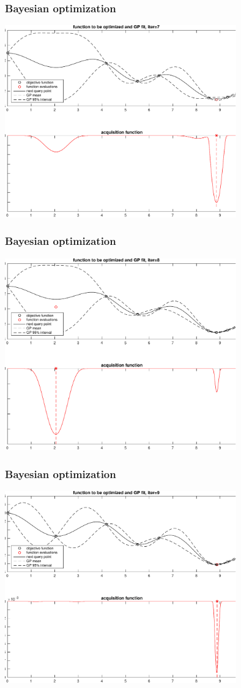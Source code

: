 \documentclass[10pt,handout]{beamer}
\begin{document}
\begin{frame}

\frametitle{Bayesian optimization}

    \includegraphics[width=10cm]{figs/bayesopt_1d_regular_iter7-crop.pdf}

\end{frame}
\begin{frame}

\frametitle{Bayesian optimization}

    \includegraphics[width=10cm]{figs/bayesopt_1d_regular_iter8-crop.pdf}

\end{frame}
\begin{frame}

\frametitle{Bayesian optimization}

    \includegraphics[width=10cm]{figs/bayesopt_1d_regular_iter9-crop.pdf}

\end{frame}
\end{document}
